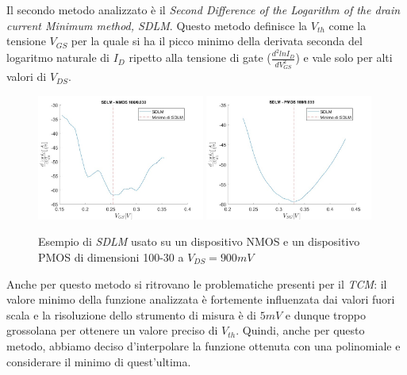 \documentclass[12pt, letterpaper]{book}
\begin{document}
Il secondo metodo analizzato è il \emph{Second Difference of the Logarithm of the drain current Minimum method, SDLM}. Questo metodo definisce la $V_{th}$ come la tensione $V_{GS}$ per la quale si ha il picco minimo della derivata seconda del logaritmo naturale di $I_D$ ripetto alla tensione di gate ($\frac{d^2lnI_D}{dV_{GS}^2}$) e vale solo per alti valori di $V_{DS}$. \\

\begin{figure}[H]
  \centering
  \includegraphics[width=0.49\textwidth]{SDLM-N4-100-30-NoFit}
  \includegraphics[width=0.49\textwidth]{SDLM-P1-100-30-NoFit}
  \caption{Esempio di \emph{SDLM} usato su un dispositivo NMOS e un dispositivo PMOS di dimensioni 100-30 a $V_{DS} = 900 mV$}
\end{figure}

Anche per questo metodo si ritrovano le problematiche presenti per il \emph{TCM}: il valore minimo della funzione analizzata è fortemente influenzata dai valori fuori scala e la risoluzione dello strumento di misura è di $5 mV$ e dunque troppo grossolana per ottenere un valore preciso di $V_{th}$.
Quindi, anche per questo metodo, abbiamo deciso d'interpolare la funzione ottenuta con una polinomiale e considerare il minimo di quest'ultima. \\
\end{document}
